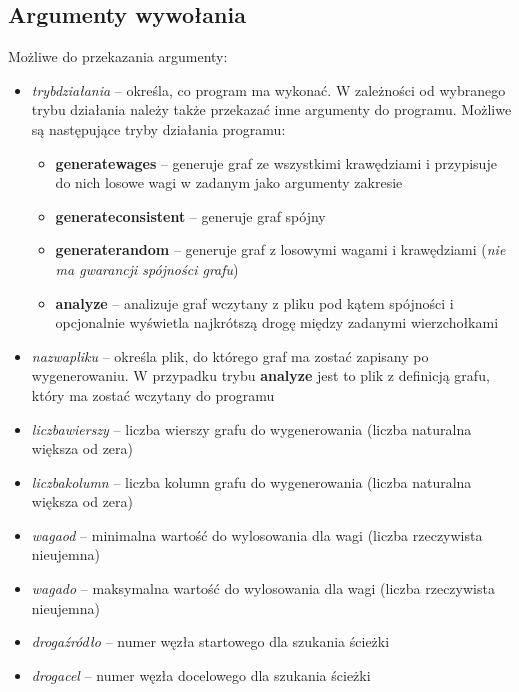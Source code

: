 \documentclass{article}
\begin{document}
\subsection{Argumenty wywołania}
Możliwe do przekazania argumenty:
\begin{itemize}
    \item \emph{tryb\textunderscore działania} -- określa, co program ma wykonać. W zależności od wybranego trybu działania należy także przekazać inne argumenty do programu. Możliwe są następujące tryby działania programu:
    \begin{itemize}
        \item \textbf{generate\textunderscore wages} -- generuje graf ze wszystkimi krawędziami i przypisuje do nich losowe wagi w zadanym jako argumenty zakresie
        \item \textbf{generate\textunderscore consistent} -- generuje graf spójny
        \item \textbf{generate\textunderscore random} -- generuje graf z losowymi wagami i krawędziami (\textit{nie ma gwarancji spójności grafu})
        \item \textbf{analyze} -- analizuje graf wczytany z pliku pod kątem spójności i opcjonalnie wyświetla najkrótszą drogę między zadanymi wierzchołkami
    \end{itemize}
    \item \emph{nazwa\textunderscore pliku} -- określa plik, do którego graf ma zostać zapisany po wygenerowaniu. W przypadku trybu \textbf{analyze} jest to plik z definicją grafu, który ma zostać wczytany do programu
    \item \emph{liczba\textunderscore wierszy} -- liczba wierszy grafu do wygenerowania (liczba naturalna większa od zera)
    \item \emph{liczba\textunderscore kolumn} -- liczba kolumn grafu do wygenerowania (liczba naturalna większa od zera)
    \item \emph{waga\textunderscore od} -- minimalna wartość do wylosowania dla wagi (liczba rzeczywista nieujemna)
    \item \emph{waga\textunderscore do} -- maksymalna wartość do wylosowania dla wagi (liczba rzeczywista nieujemna)
    \item \emph{droga\textunderscore źródło} -- numer węzła startowego dla szukania ścieżki
    \item \emph{droga\textunderscore cel} -- numer węzła docelowego dla szukania ścieżki
\end{itemize}
\end{document}
